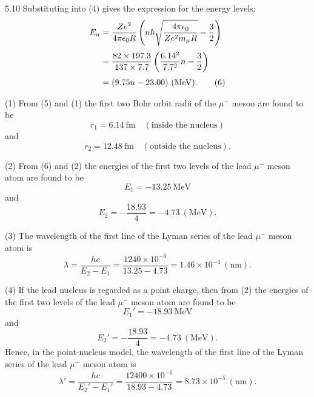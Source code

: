 \begin{solution}{5.10}
Substituting into (4) gives the expression for the energy levels:
\begin{align}
E_n&=\frac{Ze^2}{4\pi\epsilon_0 R}\left(n\hbar\sqrt{\frac{4\pi\epsilon_0}{Ze^2m_\mu R}}-\frac{3}{2}\right)\notag\\[1mm]
&=\frac{82\times 197.3}{137\times 7.7}\left(\frac{6.14^2}{7.7^2}n-\frac{3}{2}\right)\notag\\[1mm]
&=(9.75n-23.00)\ (\mathrm{MeV}). \tag{6}
\end{align}

(1) From (5) and (1) the first two Bohr orbit radii of the $\mu^-$ meson are found to be
\begin{equation*}
r_1=6.14\ \mathrm{fm}\quad(\text{inside the nucleus})
\end{equation*}
and
\begin{equation*}
r_2=12.48\ \mathrm{fm}\quad(\text{outside the nucleus}).
\end{equation*}

(2) From (6) and (2) the energies of the first two levels of the lead $\mu^-$ meson atom are
found to be
\begin{equation*}
E_1=-13.25\ \mathrm{MeV}
\end{equation*}
and
\begin{equation*}
E_2=-\frac{18.93}{4}=-4.73\ (\mathrm{MeV}).
\end{equation*}

(3) The wavelength of the first line of the Lyman series of the lead $\mu^-$ meson atom is
\begin{equation*}
\lambda=\frac{hc}{E_2-E_1}=\frac{1240\times10^{-6}}{13.25-4.73}=1.46\times10^{-4}\ (\mathrm{nm}).
\end{equation*}

(4) If the lead nucleus is regarded as a point charge, then from (2) the energies of the first
two levels of the lead $\mu^-$ meson atom are found to be
\begin{equation*}
E_1'=-18.93\ \mathrm{MeV}
\end{equation*}
and
\begin{equation*}
E_2'=-\frac{18.93}{4}=-4.73\ (\mathrm{MeV}).
\end{equation*}
Hence, in the point-nucleus model, the wavelength of the first line of the Lyman series of the
lead $\mu^-$ meson atom is
\begin{equation*}
\lambda'=\frac{hc}{E_2'-E_1'}=\frac{12400\times10^{-6}}{18.93-4.73}=8.73\times10^{-5}\ (\mathrm{nm}).
\end{equation*}


\end{solution}
